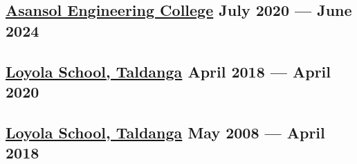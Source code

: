 





\subsection{{\href{https://www.aecwb.edu.in/}{Asansol Engineering College} \hfill July 2020 --- June 2024}}
\begin{null}

\end{null}

\subsection{{\href{https://www.loyolataldanga.com/}{Loyola School, Taldanga} \hfill April 2018 --- April 2020}}
\begin{null}

\end{null}

\subsection{{\href{https://www.loyolataldanga.com/}{Loyola School, Taldanga} \hfill May 2008 --- April 2018}}
\begin{null}

\end{null}
